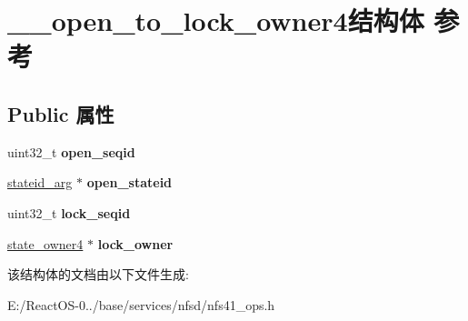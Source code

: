 \hypertarget{struct____open__to__lock__owner4}{}\section{\+\_\+\+\_\+open\+\_\+to\+\_\+lock\+\_\+owner4结构体 参考}
\label{struct____open__to__lock__owner4}
\subsection*{Public 属性}
\begin{DoxyCompactItemize}
\item 
\mbox{\label{struct____open__to__lock__owner4_abfac73c478568b118343abcec17b0dbc}} 
uint32\+\_\+t {\bfseries open\+\_\+seqid}
\item 
\mbox{\label{struct____open__to__lock__owner4_ad650c6c7be764e15613fa076dd76ce7c}} 
\hyperlink{struct____stateid__arg}{stateid\+\_\+arg} $\ast$ {\bfseries open\+\_\+stateid}
\item 
\mbox{\label{struct____open__to__lock__owner4_a045fb88a91d970ecb479af2429eb24dc}} 
uint32\+\_\+t {\bfseries lock\+\_\+seqid}
\item 
\mbox{\label{struct____open__to__lock__owner4_a998f43f54c1f25cf1e6414aa754959bc}} 
\hyperlink{struct____state__owner4}{state\+\_\+owner4} $\ast$ {\bfseries lock\+\_\+owner}
\end{DoxyCompactItemize}


该结构体的文档由以下文件生成\+:\begin{DoxyCompactItemize}
\item 
E\+:/\+React\+O\+S-\/0../base/services/nfsd/nfs41\+\_\+ops.\+h\end{DoxyCompactItemize}
